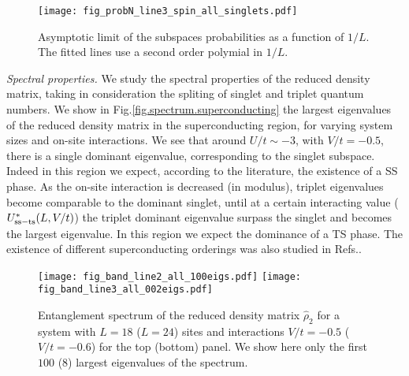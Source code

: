 \documentclass[prb,reprint,showpacs,twocolumn,superscriptaddress]{revtex4-2}
\begin{document}
\begin{figure}
\texttt{[image: fig\_probN\_line3\_spin\_all\_singlets.pdf]}
\caption{Asymptotic limit of the subspaces probabilities as a function of $1/L$. The fitted lines use a second order polymial in $1/L$.}
\label{fig.prob}
\end{figure}

\textit{Spectral properties.} We study the spectral properties of the reduced density matrix, taking in consideration the spliting of  singlet and triplet quantum numbers. 
We show in Fig.\eqref{fig.spectrum.superconducting} the largest eigenvalues of the reduced density matrix in the superconducting region, for varying system sizes and on-site interactions. 
We see that around  $U/t \sim -3$, with $V/t = -0.5$,  there is a single dominant eigenvalue, corresponding to the singlet subspace. Indeed in this region we expect, according to the literature, the existence of a SS phase. As the on-site interaction is decreased (in modulus), triplet eigenvalues become comparable to the dominant singlet, until at a certain interacting value ($U^*_{\rm{ss-ts}}(L,V/t)$) the triplet dominant eigenvalue surpass the singlet and becomes the largest eigenvalue. In this region we expect the dominance of a TS phase. The existence  of different superconducting orderings was also studied in Refs.\cite{nakamura00,lin00,Shinjo2019,Kazuya2020}.

\begin{figure}
\texttt{[image: fig\_band\_line2\_all\_100eigs.pdf]}
\texttt{[image: fig\_band\_line3\_all\_002eigs.pdf]}
\caption{ Entanglement spectrum of the reduced density matrix $\hat \rho_2$ for a system with $L=18$ ($L=24$) sites and interactions $V/t=-0.5$ ($V/t=-0.6$) for the top (bottom) panel. We show here only the first $100$ ($8$) largest eigenvalues of the spectrum.}
\label{fig.spectrum.superconducting}
\end{figure}
\end{document}
